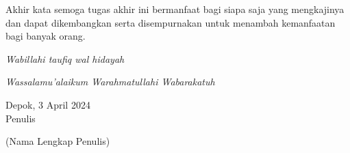 Akhir kata semoga tugas akhir ini bermanfaat bagi siapa saja yang mengkajinya dan dapat dikembangkan serta disempurnakan untuk menambah kemanfaatan bagi banyak orang.

\vspace{0.5 cm}

\textit{Wabillahi taufiq wal hidayah}

\textit{Wassalamu'alaikum Warahmatullahi Wabarakatuh}





\begin{flushleft}
Depok, 3 April 2024\\
Penulis
\vspace{1.5 cm}

(Nama Lengkap Penulis)

\end{flushleft} 
